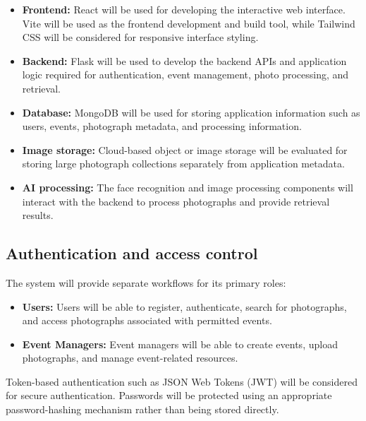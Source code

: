 \documentclass[11pt,a4paper]{article}
\begin{document}
\begin{itemize}[leftmargin=0.7cm]

    \item \textbf{Frontend:} React will be used for developing the
    interactive web interface. Vite will be used as the frontend
    development and build tool, while Tailwind CSS will be considered
    for responsive interface styling.

    \item \textbf{Backend:} Flask will be used to develop the backend
    APIs and application logic required for authentication, event
    management, photo processing, and retrieval.

    \item \textbf{Database:} MongoDB will be used for storing
    application information such as users, events, photograph
    metadata, and processing information.

    \item \textbf{Image storage:} Cloud-based object or image storage
    will be evaluated for storing large photograph collections
    separately from application metadata.

    \item \textbf{AI processing:} The face recognition and image
    processing components will interact with the backend to process
    photographs and provide retrieval results.

\end{itemize}

\subsection{Authentication and access control}

The system will provide separate workflows for its primary roles:

\begin{itemize}[leftmargin=0.7cm]

    \item \textbf{Users:} Users will be able to register, authenticate,
    search for photographs, and access photographs associated with
    permitted events.

    \item \textbf{Event Managers:} Event managers will be able to
    create events, upload photographs, and manage event-related
    resources.

\end{itemize}

Token-based authentication such as JSON Web Tokens (JWT) will be
considered for secure authentication. Passwords will be protected
using an appropriate password-hashing mechanism rather than being
stored directly.
\end{document}

